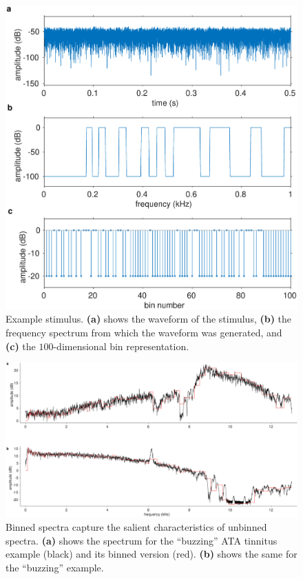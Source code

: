 \documentclass[journal]{IEEEtran}
\begin{document}
\begin{figure}[h]
  \centering
  \includegraphics[width=\linewidth]{gfx/example_stimulus.eps}
  \caption{Example stimulus. \textbf{(a)} shows the waveform of the stimulus,
  \textbf{(b)} the frequency spectrum from which the waveform was generated,
  and \textbf{(c)} the $100$-dimensional bin representation.}
  \label{fig:examplestimulus}
\end{figure}

\begin{figure}[h]
	\centering
	\includegraphics[width=\linewidth]{gfx/binned_vs_unbinned_spect.eps}
	\caption{Binned spectra capture the salient characteristics of unbinned spectra.
  \textbf{(a)} shows the spectrum for the ``buzzing'' ATA tinnitus example
  (black) and its binned version (red). \textbf{(b)} shows the same for the ``buzzing'' example.}
	\label{fig:binned_vs_unbinned_spect}
\end{figure}
\end{document}
